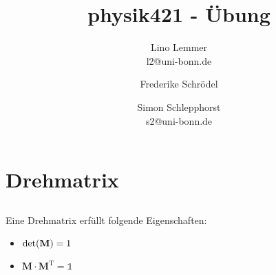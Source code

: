 

\setcounter{thezettel}{9}
\renewcommand\thesection{\arabic{thezettel}.\arabic{section}}



\title{physik421 - Übung }
\author{Lino Lemmer \\ \small{l2@uni-bonn.de} \and Frederike Schrödel \and Simon Schlepphorst\\ \small{s2@uni-bonn.de}}


\maketitle

\section{Drehmatrix}

\subsection{}

Eine Drehmatrix erfüllt folgende Eigenschaften:
\begin{itemize}
    \item
        $\det(\mathbf{M}) = 1$
    \item
        $\mathbf{M}\cdot\mathbf{M}^\text{T} = \mathbb{1}$
\end{itemize}

